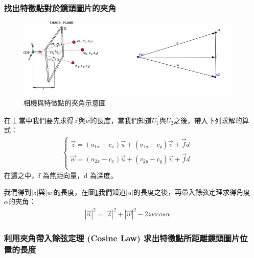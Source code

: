 	\subsubsection{找出特徵點對於鏡頭圖片的夾角}
	
	\begin{figure}
	\begin{center}
	  \includegraphics[width=1.0\textwidth]{figures/Included_Angle.jpg}
	  \caption{相機與特徵點的夾角示意圖}
	  \label{fig:Included Angle}
	\end{center}
	\end{figure}
	
	在 \ref{fig:Included Angle} 當中我們要先求得$\vec{z}$與$\vec{w}$的長度，當我們知道$\vec{U_1}$與$\vec{U_2}$之後，帶入下列求解的算式：
	\begin{align}
		\left\{
		\begin{array}{cccc}
		\vec{z} = (u_{1x} - c_x)\vec{u} + (v_{1y} - c_y)\vec{v} + \vec{f}d\\
		\vec{w} = (u_{2x} - c_x)\vec{u} + (v_{2y} - c_y)\vec{v} + \vec{f}d\\
		\end{array}
		\right.
	\end{align}
	在這之中，f 為焦距向量，d 為深度。	
	
	我們得到$|z|$與$|w|$的長度，在圖\ref{fig:Included Angle}我們知道$|u|$的長度之後，再帶入餘弦定理求得角度$\alpha$的夾角：
	\begin{align}
		|\vec{u}|^2 = |\vec{z}|^2 + |\vec{w}|^2 - 2zwcos\alpha
	\end{align}	
	
	\subsubsection{利用夾角帶入餘弦定理 (Cosine Law) 求出特徵點所距離鏡頭圖片位置的長度}
	
